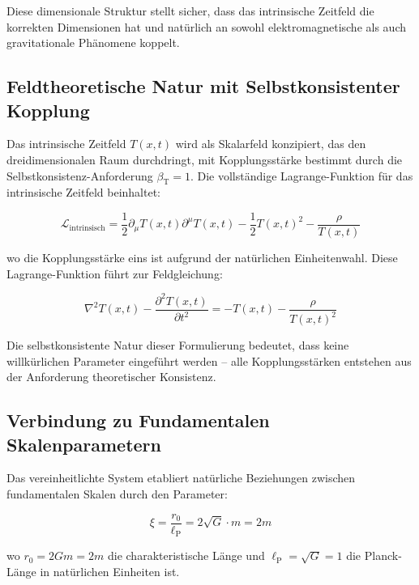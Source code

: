 \documentclass[12pt,a4paper]{article}
\newcommand{\Tfieldt}{T(x,t)}
\newcommand{\betaT}{\beta_{\text{T}}}
\newcommand{\lP}{\ell_{\text{P}}}
\newcommand{\xipar}{\xi}
\begin{document}
	Diese dimensionale Struktur stellt sicher, dass das intrinsische Zeitfeld die korrekten Dimensionen hat und natürlich an sowohl elektromagnetische als auch gravitationale Phänomene koppelt.
	
	\subsection{Feldtheoretische Natur mit Selbstkonsistenter Kopplung}
	\label{subsec:field_theoretic_self_consistent}
	
	Das intrinsische Zeitfeld $\Tfieldt$ wird als Skalarfeld konzipiert, das den dreidimensionalen Raum durchdringt, mit Kopplungsstärke bestimmt durch die Selbstkonsistenz-Anforderung $\betaT = 1$. Die vollständige Lagrange-Funktion für das intrinsische Zeitfeld beinhaltet:
	
	\begin{equation}
		\mathcal{L}_{\text{intrinsisch}} = \frac{1}{2} \partial_\mu \Tfieldt \partial^\mu \Tfieldt - \frac{1}{2}\Tfieldt^2 - \frac{\rho}{\Tfieldt}
	\end{equation}
	
	wo die Kopplungsstärke eins ist aufgrund der natürlichen Einheitenwahl. Diese Lagrange-Funktion führt zur Feldgleichung:
	
	\begin{equation}
		\nabla^2 \Tfieldt - \frac{\partial^2 \Tfieldt}{\partial t^2} = -\Tfieldt - \frac{\rho}{\Tfieldt^2}
	\end{equation}
	
	Die selbstkonsistente Natur dieser Formulierung bedeutet, dass keine willkürlichen Parameter eingeführt werden – alle Kopplungsstärken entstehen aus der Anforderung theoretischer Konsistenz.
	
	\subsection{Verbindung zu Fundamentalen Skalenparametern}
	\label{subsec:fundamental_scales}
	
	Das vereinheitlichte System etabliert natürliche Beziehungen zwischen fundamentalen Skalen durch den Parameter:
	
	\begin{equation}
		\xipar = \frac{r_0}{\lP} = 2\sqrt{G} \cdot m = 2m
	\end{equation}
	
	wo $r_0 = 2Gm = 2m$ die charakteristische Länge und $\lP = \sqrt{G} = 1$ die Planck-Länge in natürlichen Einheiten ist.
	
\end{document}

